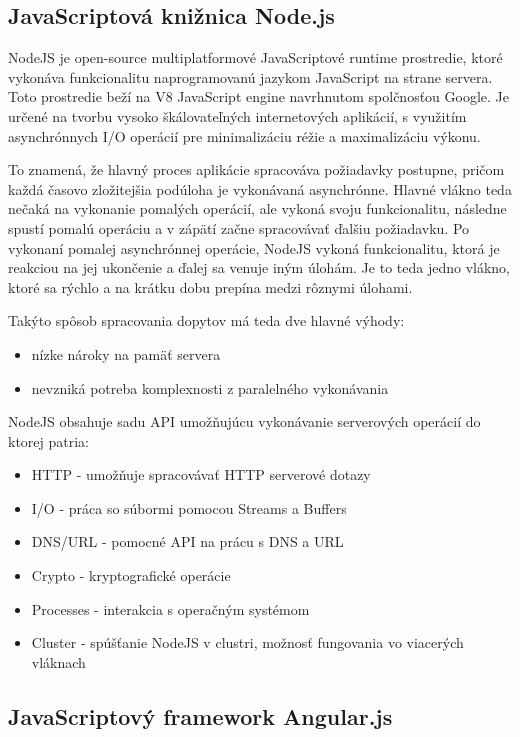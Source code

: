 \subsection{JavaScriptová knižnica Node.js}
NodeJS je open-source multiplatformové JavaScriptové runtime prostredie, ktoré vykonáva funkcionalitu naprogramovanú jazykom JavaScript na strane servera. Toto prostredie beží na V8 JavaScript engine navrhnutom spolčnosťou Google. Je určené na tvorbu vysoko škálovateľných internetových aplikácií, s využitím asynchrónnych I/O operácií \cite{doi:10.1109/MIC.2010.145} pre minimalizáciu réžie a maximalizáciu výkonu. 

To znamená, že hlavný proces aplikácie spracováva požiadavky postupne, pričom každá časovo zložitejšia podúloha je vykonávaná asynchrónne. Hlavné vlákno teda nečaká na vykonanie pomalých operácií, ale vykoná svoju funkcionalitu, následne spustí pomalú operáciu a v zápätí začne spracovávať ďalšiu požiadavku. Po vykonaní pomalej asynchrónnej operácie, NodeJS vykoná funkcionalitu, ktorá je reakciou na jej ukončenie a ďalej sa venuje iným úlohám. Je to teda jedno vlákno, ktoré sa rýchlo a na krátku dobu prepína medzi rôznymi úlohami. 

Takýto spôsob spracovania dopytov má teda dve hlavné výhody:
\begin{itemize}
	\item nízke nároky na pamäť servera
	\item nevzniká potreba komplexnosti z paralelného vykonávania
\end{itemize}

NodeJS obsahuje sadu API umožňujúcu vykonávanie serverových operácií do ktorej patria:
\begin{itemize}
	\item HTTP - umožňuje spracovávať HTTP serverové dotazy
	\item I/O - práca so súbormi pomocou Streams a Buffers
	\item DNS/URL - pomocné API na prácu s DNS a URL
	\item Crypto - kryptografické operácie
	\item Processes - interakcia s operačným systémom
	\item Cluster - spúšťanie NodeJS v clustri, možnosť fungovania vo viacerých vláknach
\end{itemize}


\subsection{JavaScriptový framework Angular.js}\label{sec:angular}

